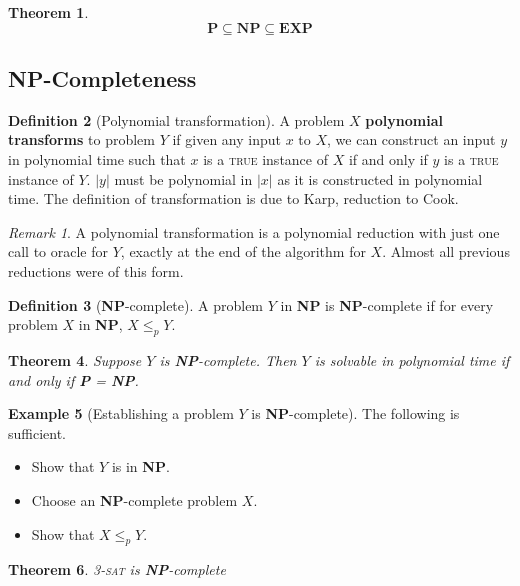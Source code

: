 \documentclass[10pt, oneside, reqno]{amsart}
\theoremstyle{plain}%
\newtheorem{thm}{Theorem}[section]
\theoremstyle{definition}
\newtheorem{defn}[thm]{Definition}
\newtheorem{exmp}[thm]{Example}
\theoremstyle{remark}
\newtheorem*{rem}{Remark}
\begin{document}
\begin{thm}
\[
    \mathbf{P} \subseteq \mathbf{NP} \subseteq \mathbf{EXP}
\]\end{thm}

\subsection{\textbf{NP}-Completeness} %
\label{sub:np_completeness}
\begin{defn}[Polynomial transformation]
A problem $X$ \textbf{polynomial transforms} to problem $Y$ if given any  input $x$ to $X$, we can construct an input $y$ in polynomial time such that $x$ is a \textsc{true} instance of $X$ if and only if $y$ is a \textsc{true} instance of $Y$. $|y|$ must be polynomial in $|x|$ as it is constructed in polynomial time. The definition of transformation is due to Karp, reduction to Cook.
\end{defn}

\begin{rem}
    A polynomial transformation is a polynomial reduction with just one call to oracle for $Y$, exactly at the end of the algorithm for $X$. Almost all previous reductions were of this form.
\end{rem}

\begin{defn}[\textbf{NP}-complete]
    A problem $Y$ in \textbf{NP} is \textbf{NP}-complete if for every problem $X$ in \textbf{NP}, $X \leq_p Y$.
\end{defn}

\begin{thm}
    Suppose $Y$ is \textbf{NP}-complete.  Then $Y$ is solvable in polynomial time if and only if \textbf{P} = \textbf{NP}.
\end{thm}

\begin{exmp}[Establishing a problem $Y$ is \textbf{NP}-complete]
    The following is sufficient.
    \begin{itemize}
        \item Show that $Y$ is in \textbf{NP}.
        \item Choose an \textbf{NP}-complete problem $X$.
        \item Show that $X \leq_p Y$. 
    \end{itemize}
\end{exmp}

\begin{thm}
    \textsc{3-sat} is \textbf{NP}-complete
\end{thm}
\end{document}
